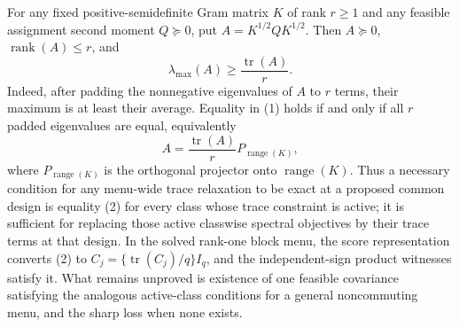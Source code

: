 For any fixed positive-semidefinite Gram matrix \(K\) of rank \(r\ge1\) and any feasible assignment second moment \(Q\succeq0\), put \(A=K^{1/2}QK^{1/2}\).  Then \(A\succeq0\), \(\operatorname{rank}(A)\le r\), and
\[
\lambda_{\max}(A)\ge\frac{\operatorname{tr}(A)}r. \tag{1}
\]
Indeed, after padding the nonnegative eigenvalues of \(A\) to \(r\) terms, their maximum is at least their average.  Equality in (1) holds if and only if all \(r\) padded eigenvalues are equal, equivalently
\[
A=\frac{\operatorname{tr}(A)}r P_{\operatorname{range}(K)}, \tag{2}
\]
where \(P_{\operatorname{range}(K)}\) is the orthogonal projector onto \(\operatorname{range}(K)\).  Thus a necessary condition for any menu-wide trace relaxation to be exact at a proposed common design is equality (2) for every class whose trace constraint is active; it is sufficient for replacing those active classwise spectral objectives by their trace terms at that design.  In the solved rank-one block menu, the score representation converts (2) to \(C_j=\{\operatorname{tr}(C_j)/q\}I_q\), and the independent-sign product witnesses satisfy it.  What remains unproved is existence of one feasible covariance satisfying the analogous active-class conditions for a general noncommuting menu, and the sharp loss when none exists.